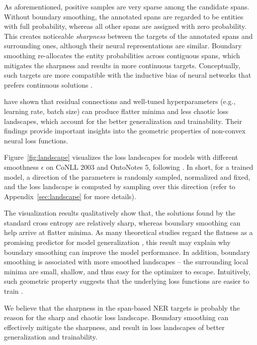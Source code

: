 \documentclass[11pt]{article}
\begin{document}
As aforementioned, positive samples are very sparse among the candidate spans. Without boundary smoothing, the annotated spans are regarded to be entities with full probability, whereas all other spans are assigned with zero probability. This creates noticeable \emph{sharpness} between the targets of the annotated spans and surrounding ones, although their neural representations are similar. Boundary smoothing re-allocates the entity probabilities across contiguous spans, which mitigates the sharpness and results in more continuous targets. Conceptually, such targets are more compatible with the inductive bias of neural networks that prefers continuous solutions \citep{hornik1989multilayer}. 

\citet{li2018visualizing} have shown that residual connections and well-tuned hyperparameters (e.g., learning rate, batch size) can produce flatter minima and less chaotic loss landscapes, which account for the better generalization and trainability. Their findings provide important insights into the geometric properties of non-convex neural loss functions. 

Figure~\ref{fig:landscape} visualizes the loss landscapes for models with different smoothness $\epsilon$ on CoNLL 2003 and OntoNotes 5, following \citet{li2018visualizing}. In short, for a trained model, a direction of the parameters is randomly sampled, normalized and fixed, and the loss landscape is computed by sampling over this direction (refer to Appendix~\ref{sec:landscape} for more details). 


The visualization results qualitatively show that, the solutions found by the standard cross entropy are relatively sharp, whereas boundary smoothing can help arrive at flatter minima. As many theoretical studies regard the flatness as a promising predictor for model generalization \citep{hochreiter1997flat,jiang2019fantastic}, this result may explain why boundary smoothing can improve the model performance. In addition, boundary smoothing is associated with more smoothed landscapes -- the surrounding local minima are small, shallow, and thus easy for the optimizer to escape. Intuitively, such geometric property suggests that the underlying loss functions are easier to train \citep{li2018visualizing}. 

We believe that the sharpness in the span-based NER targets is probably the reason for the sharp and chaotic loss landscape. Boundary smoothing can effectively mitigate the sharpness, and result in loss landscapes of better generalization and trainability. 
\end{document}
